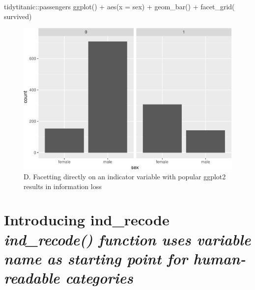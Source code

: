 \begin{Schunk}
\begin{Sinput}
tidytitanic::passengers %
ggplot() + 
  aes(x = sex) + 
  geom_bar() + 
  facet_grid(~ survived)
\end{Sinput}
\begin{figure}
\includegraphics[width=0.69\linewidth]{r_journal_files/figure-latex/unnamed-chunk-12-1} \caption[D]{D. Facetting directly on an indicator variable with popular ggplot2 results in information loss}\label{fig:unnamed-chunk-12}
\end{figure}
\end{Schunk}

\hypertarget{introducing-ind_recode-ind_recode-function-uses-variable-name-as-starting-point-for-human-readable-categories}{%
\section{\texorpdfstring{Introducing ind\_recode \emph{ind\_recode()
function uses variable name as starting point for human-readable
categories}}{Introducing ind\_recode ind\_recode() function uses variable name as starting point for human-readable categories}}\label{introducing-ind_recode-ind_recode-function-uses-variable-name-as-starting-point-for-human-readable-categories}}

